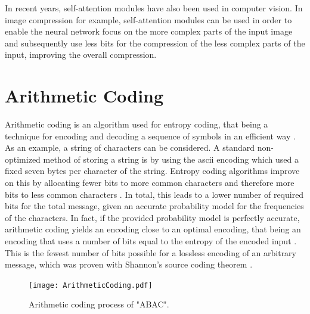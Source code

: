 In recent years, self-attention modules have also been used in computer vision. In image compression for example, self-attention modules can be used in order to enable the neural network focus on the more complex parts of the input image and subsequently use less bits for the compression of the less complex parts of the input, improving the overall compression\citep{cheng_learned_2020, liu_non-local_2019}. 

\section{Arithmetic Coding}
\label{sec:arithmetic}
Arithmetic coding is an algorithm used for entropy coding, that being a technique for encoding and decoding a sequence of symbols in an efficient way \citep{witten_arithmetic_1987}. As an example, a string of characters can be considered. A standard non-optimized method of storing a string is by using the \ac{ascii} encoding which used a fixed seven bytes per character of the string. Entropy coding algorithms improve on this by allocating fewer bits to more common characters and therefore more bits to less common characters \citep{witten_arithmetic_1987}. In total, this leads to a lower number of required bits for the total message, given an accurate probability model for the frequencies of the characters. In fact, if the provided probability model is perfectly accurate, arithmetic coding yields an encoding close to an optimal encoding, that being an encoding that uses a number of bits equal to the entropy of the encoded input \citep{witten_arithmetic_1987}. This is the fewest number of bits possible for a lossless encoding of an arbitrary message, which was proven with Shannon's source coding theorem \citep{shannon_mathematical_1948,mackay_information_2003}.

\begin{figure}
\centering
\texttt{[image: ArithmeticCoding.pdf]}
\caption{Arithmetic coding process of "ABAC".}
\label{fig:arithmetic}
\end{figure}

